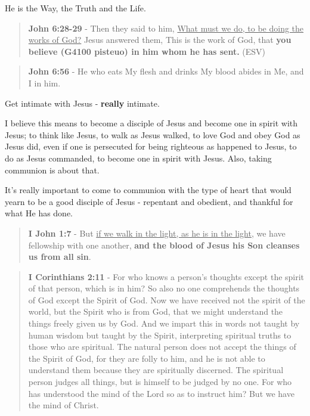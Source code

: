 \documentclass[11pt]{article}
\begin{document}
He is the Way, the Truth and the Life.

\begin{quote}
\textbf{John 6:28-29} - Then they said to him, \uline{What must we do, to be doing the works of God?} Jesus answered them, This is the work of God, that \textbf{you believe (G4100 pisteuo) in him whom he has sent.} (ESV)
\end{quote}

\begin{quote}
\textbf{John 6:56} - He who eats My flesh and drinks My blood abides in Me, and I in him.
\end{quote}

Get intimate with Jesus - \textbf{really} intimate.

I believe this means to become a disciple of Jesus and become one in spirit with Jesus; to think like Jesus, to walk as Jesus walked, to love God and obey God as Jesus did, even if one is persecuted for being righteous as happened to Jesus, to do as Jesus commanded, to become one in spirit with Jesus. Also, taking communion is about that.

It's really important to come to communion with the type of heart that would yearn to be a good disciple of Jesus - repentant and obedient, and thankful for what He has done.

\begin{quote}
\textbf{I John 1:7} - But \uline{if we walk in the light, as he is in the light}, we have fellowship with one another, \textbf{and the blood of Jesus his Son cleanses us from all sin}.
\end{quote}

\begin{quote}
\textbf{I Corinthians 2:11} - For who knows a person's thoughts except the spirit of that person, which is in him? So also no one comprehends the thoughts of God except the Spirit of God. Now we have received not the spirit of the world, but the Spirit who is from God, that we might understand the things freely given us by God. And we impart this in words not taught by human wisdom but taught by the Spirit, interpreting spiritual truths to those who are spiritual. The natural person does not accept the things of the Spirit of God, for they are folly to him, and he is not able to understand them because they are spiritually discerned. The spiritual person judges all things, but is himself to be judged by no one. For who has understood the mind of the Lord so as to instruct him? But we have the mind of Christ.
\end{quote}
\end{document}
